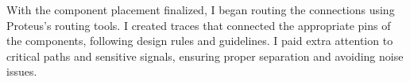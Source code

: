 With the component placement finalized, I began routing the connections using Proteus's routing tools. I created traces that connected the appropriate pins of the components, following design rules and guidelines. I paid extra attention to critical paths and sensitive signals, ensuring proper separation and avoiding noise issues.

%




%